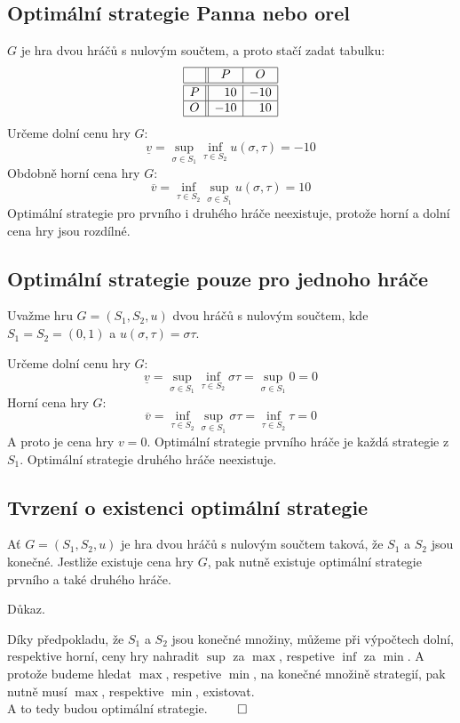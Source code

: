 \subsection{Optimální strategie Panna nebo orel}
$G$ je hra dvou hráčů s nulovým součtem, a proto stačí zadat tabulku:
\[
\begin{array}{|c| |c|c|}
    \hline
    & P & O \\ \hline \hline
    P & \phantom{-}10 & -10 \\ \hline
    O & -10 & \phantom{-}10 \\ \hline
\end{array}
\]
Určeme dolní cenu hry $G$:
\[
    \underline{v} = \sup_{\sigma \in S_1} \inf_{\tau \in S_2} u(\sigma, \tau) = -10
\]
Obdobně horní cena hry $G$:
\[
    \overline{v} = \inf_{\tau \in S_2} \sup_{\sigma \in S_1} u(\sigma, \tau) = 10
\]
Optimální strategie pro prvního i druhého hráče neexistuje, protože horní a dolní cena hry jsou rozdílné.

\subsection{Optimální strategie pouze pro jednoho hráče}
Uvažme hru $G=(S_1, S_2, u)$ dvou hráčů s nulovým součtem, kde $S_1 = S_2 = (0,1)$ a $u(\sigma, \tau) = \sigma \tau$.

Určeme dolní cenu hry $G$:
\[
    \underline{v} = \sup_{\sigma \in S_1} \inf_{\tau \in S_2} \sigma \tau = \sup_{\sigma \in S_1} 0 = 0
\]
Horní cena hry $G$:
\[
    \overline{v} = \inf_{\tau \in S_2} \sup_{\sigma \in S_1} \sigma \tau = \inf_{\tau \in S_2} \tau = 0
\]
A proto je cena hry $v = 0$. Optimální strategie prvního hráče je každá strategie z $S_1$. Optimální strategie druhého 
hráče neexistuje.

\subsection{Tvrzení o existenci optimální strategie}
Ať $G = (S_1, S_2, u)$ je hra dvou hráčů s nulovým součtem taková, že $S_1$ a $S_2$ jsou konečné. Jestliže existuje cena
hry $G$, pak nutně existuje optimální strategie prvního a také druhého hráče.

Důkaz.

Díky předpokladu, že $S_1$ a $S_2$ jsou konečné množiny, můžeme při výpočtech dolní, respektive horní, ceny hry nahradit
$\sup$ za $\max$, respetive $\inf$ za $\min$. A protože budeme hledat $\max$, respetive $\min$, na konečné množině 
strategií, pak nutně musí $\max$, respektive $\min$, existovat. \\ A to tedy budou optimální strategie. $\qed$

